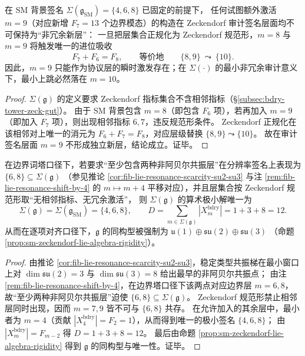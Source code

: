 \begin{corollary}[协议激发层与审计签名层的分离：\texorpdfstring{$m=9$}{m=9} 的进位吸收]\label{cor:zeckendorf-carry-absorption-m9}
在 SM 背景签名 \(\Sigma(\mathfrak g_{\mathrm{SM}})=\{4,6,8\}\) 已固定的前提下，
任何试图额外激活 \(m=9\)（对应新增 \(F_7=13\) 个边界模态）的构造在 Zeckendorf 审计签名层面均不可保持为“非冗余新层”：
一旦把层集合正规化为 Zeckendorf 规范形，\(m=8\) 与 \(m=9\) 将触发唯一的进位吸收
\[
F_{7}+F_{6}=F_{8},
\qquad\text{等价地}\qquad
\{8,9\}\ \leadsto\ \{10\}.
\]
因此，\(m=9\) 只能作为协议层的瞬时激发存在；在 \(\Sigma(\cdot)\) 的最小非冗余审计意义下，最小上跳必然落在 \(m=10\)。
\end{corollary}
\begin{proof}
\(\Sigma(\mathfrak g)\) 的定义要求 Zeckendorf 指标集合不含相邻指标（\S\ref{subsec:bdry-tower-zeck-gut}）。
由于 SM 背景包含 \(m=8\)（即包含 \(F_6\) 项），若再加入 \(m=9\)（即加入 \(F_7\) 项），则出现相邻指标 \(6,7\)，违反规范形条件。
Zeckendorf 正规化在该相邻对上唯一的消元为 \(F_6+F_7=F_8\)，对应层级替换 \(\{8,9\}\leadsto\{10\}\)。
故在审计签名层面 \(m=9\) 不形成独立新层，结论成立。证毕。
\end{proof}

\begin{corollary}\label{cor:sm-minimal-triple-selection-law}
在边界词塔口径下，若要求“至少包含两种非阿贝尔共振层”在分辨率签名上表现为
\(
\{6,8\}\subseteq \Sigma(\mathfrak g)
\)
（参见推论 \ref{cor:fib-lie-resonance-scarcity-su2-su3} 与注 \ref{rem:fib-lie-resonance-shift-by-4} 的 \(m\mapsto m+4\) 平移对应），并且层集合按 Zeckendorf 规范形取“无相邻指标、无冗余激活”，
则 \(\Sigma(\mathfrak g)\) 的算术极小解唯一为
\[
\Sigma(\mathfrak g)=\Sigma(\mathfrak g_{\mathrm{SM}})=\{4,6,8\},
\qquad
D=\sum_{m\in\Sigma(\mathfrak g)}|X_m^{\mathrm{bdry}}|=1+3+8=12.
\]
从而在逐项对齐口径下，\(\mathfrak g\) 的同构型被强制为
\(
\mathfrak u(1)\oplus\mathfrak{su}(2)\oplus\mathfrak{su}(3)
\)
（命题 \ref{prop:sm-zeckendorf-lie-algebra-rigidity}）。
\end{corollary}
\begin{proof}
由推论 \ref{cor:fib-lie-resonance-scarcity-su2-su3}，稳定类型共振梯在最小窗口上对 \(\dim\mathfrak{su}(2)=3\) 与 \(\dim\mathfrak{su}(3)=8\) 给出最早的非阿贝尔共振点；
由注 \ref{rem:fib-lie-resonance-shift-by-4}，在边界塔口径下该两点对应边界层 \(m=6,8\)，故“至少两种非阿贝尔共振层”迫使 \(\{6,8\}\subseteq\Sigma(\mathfrak g)\)。
Zeckendorf 规范形禁止相邻层同时出现，因而 \(m=7,9\) 皆不可与 \(\{6,8\}\) 共存。
在允许加入的其余层中，最小者为 \(m=4\)（贡献 \(|X_4^{\mathrm{bdry}}|=F_2=1\)），从而得到唯一的极小签名 \(\{4,6,8\}\)；
由 \(|X_m^{\mathrm{bdry}}|=F_{m-2}\) 得 \(D=1+3+8=12\)。
最后由命题 \ref{prop:sm-zeckendorf-lie-algebra-rigidity} 得到 \(\mathfrak g\) 的同构型与唯一性。证毕。
\end{proof}

